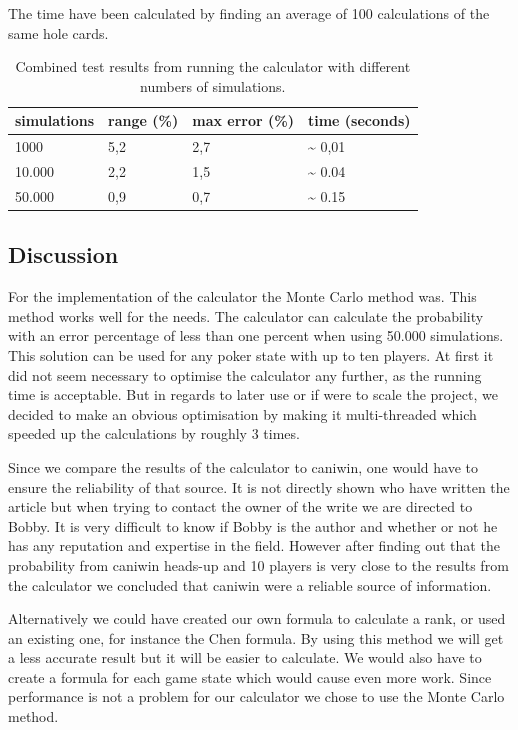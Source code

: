 The time have been calculated by finding an average of 100 calculations of the same hole cards.
\vspace{4mm}
\begin{table}[H]
  \center
  \begin{tabular}{ | l | l | l | l | }
    \hline
    simulations & range (\%) & max error (\%) & time (seconds) \\
    \hline                       
    1000 & 5,2 & 2,7 & \textasciitilde{ 0,01} \\
    10.000 & 2,2 & 1,5 & \textasciitilde{ 0.04}\\
    50.000 & 0,9 & 0,7 & \textasciitilde{ 0.15}\\
  \hline  
  \end{tabular}
  \caption{Combined test results from running the calculator with different numbers of simulations. \label{tab:mc-total}}
\end{table}
\vspace{4mm}

\subsection{Discussion}
For the implementation of the calculator the Monte Carlo method was. This method works well for the needs. The calculator can calculate the probability with an error percentage of less than one percent when using 50.000 simulations. This solution can be used for any poker state with up to ten players. At first it did not seem necessary to optimise the calculator any further, as the running time is acceptable. But in regards to later use or if were to scale the project, we decided to make an obvious optimisation by making it multi-threaded which speeded up the calculations by roughly 3 times.	

Since we compare the results of the calculator to caniwin, one would have to ensure the reliability of that source. It is not directly shown who have written the article but when trying to contact the owner of the write we are directed to Bobby. It is very difficult to know if Bobby is the author and whether or not he has any reputation and expertise in the field. However after finding out that the probability from caniwin heads-up and 10 players is very close to the results from the calculator we concluded that caniwin were a reliable source of information.

Alternatively we could have created our own formula to calculate a rank, or used an existing one, for instance the Chen formula. By using this method we will get a less accurate result but it will be easier to calculate. We would also have to create a formula for each game state which would cause even more work. Since performance is not a problem for our calculator we chose to use the Monte Carlo method.

